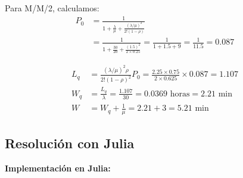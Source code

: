 \documentclass[12pt, a4paper, oneside]{book}
\theoremstyle{definition}
\begin{document}
Para M/M/2, calculamos:
\begin{align*}
P_0 &= \frac{1}{1 + \frac{\lambda}{\mu} + \frac{(\lambda/\mu)^2}{2!(1-\rho)}} \\
&= \frac{1}{1 + \frac{30}{20} + \frac{(1.5)^2}{2 \times 0.25}} = \frac{1}{1 + 1.5 + 9} = \frac{1}{11.5} = 0.087
\end{align*}

\begin{align*}
L_q &= \frac{(\lambda/\mu)^2 \rho}{2!(1-\rho)^2} P_0 = \frac{2.25 \times 0.75}{2 \times 0.625} \times 0.087 = 1.107 \\
W_q &= \frac{L_q}{\lambda} = \frac{1.107}{30} = 0.0369 \text{ horas} = 2.21 \text{ min} \\
W &= W_q + \frac{1}{\mu} = 2.21 + 3 = 5.21 \text{ min}
\end{align*}

\subsection{Resolución con Julia}

\textbf{Implementación en Julia:}
\end{document}
